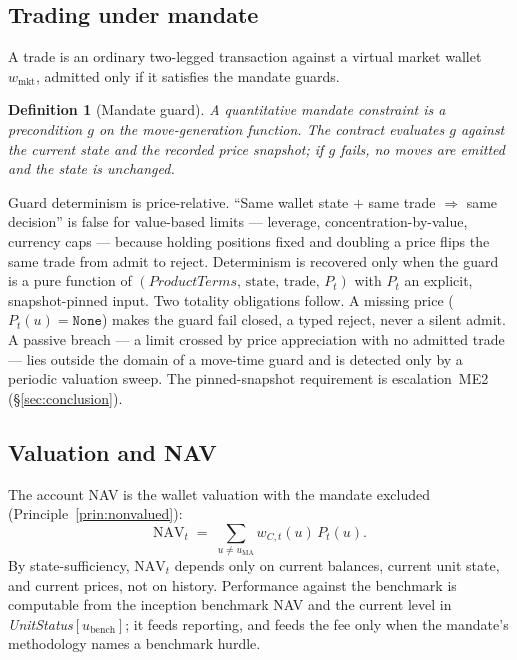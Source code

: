 \documentclass[11pt,a4paper]{article}
\newtheorem{definition}{Definition}[section]
\begin{document}
\subsection{Trading under mandate}
\label{sec:managed-trading}

A trade is an ordinary two-legged transaction against a virtual market wallet $w_{\text{mkt}}$,
admitted only if it satisfies the mandate guards.

\begin{definition}[Mandate guard]
A quantitative mandate constraint is a precondition $g$ on the move-generation function. The
contract evaluates $g$ against the current state and the recorded price snapshot; if $g$ fails, no
moves are emitted and the state is unchanged.
\end{definition}

Guard determinism is price-relative. ``Same wallet state $+$ same trade $\Rightarrow$ same
decision'' is false for value-based limits --- leverage, concentration-by-value, currency caps ---
because holding positions fixed and doubling a price flips the same trade from admit to reject.
Determinism is recovered only when the guard is a pure function of
$(\textit{ProductTerms},\,\text{state},\,\text{trade},\,P_t)$ with $P_t$ an explicit,
snapshot-pinned input. Two totality obligations follow. A missing price ($P_t(u)=\texttt{None}$)
makes the guard fail closed, a typed reject, never a silent admit. A passive breach --- a limit
crossed by price appreciation with no admitted trade --- lies outside the domain of a move-time
guard and is detected only by a periodic valuation sweep. The pinned-snapshot requirement is
escalation~ME2 (\S\ref{sec:conclusion}).

\subsection{Valuation and NAV}
\label{sec:managed-nav}

The account NAV is the wallet valuation with the mandate excluded
(Principle~\ref{prin:nonvalued}):
\[
\mathrm{NAV}_t \;=\; \sum_{u\neq u_{\mathrm{MA}}} w_{C,t}(u)\,P_t(u).
\]
By state-sufficiency, $\mathrm{NAV}_t$ depends only on current balances, current unit state, and
current prices, not on history. Performance against the benchmark is computable from the inception
benchmark NAV and the current level in \textit{UnitStatus}$[u_{\mathrm{bench}}]$; it feeds
reporting, and feeds the fee only when the mandate's methodology names a benchmark hurdle.
\end{document}
